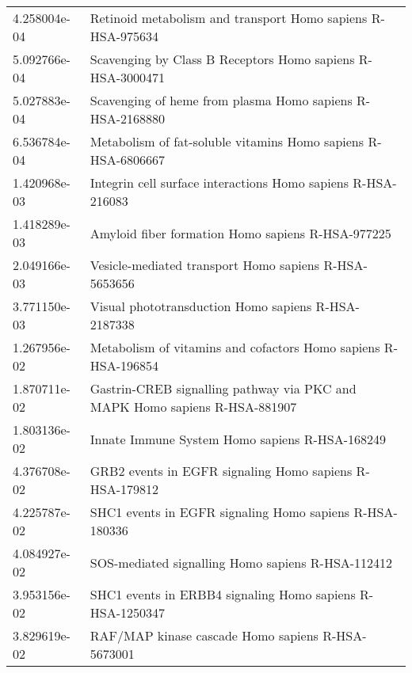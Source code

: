 \begin{longtable}{p{2.4cm}p{14.5cm}}
             4.258004e-04 &                                   Retinoid metabolism and transport Homo sapiens R-HSA-975634 \\
             5.092766e-04 &                                    Scavenging by Class B Receptors Homo sapiens R-HSA-3000471 \\
             5.027883e-04 &                                     Scavenging of heme from plasma Homo sapiens R-HSA-2168880 \\
             6.536784e-04 &                                 Metabolism of fat-soluble vitamins Homo sapiens R-HSA-6806667 \\
             1.420968e-03 &                                  Integrin cell surface interactions Homo sapiens R-HSA-216083 \\
             1.418289e-03 &                                             Amyloid fiber formation Homo sapiens R-HSA-977225 \\
             2.049166e-03 &                                         Vesicle-mediated transport Homo sapiens R-HSA-5653656 \\
             3.771150e-03 &                                           Visual phototransduction Homo sapiens R-HSA-2187338 \\
             1.267956e-02 &                                Metabolism of vitamins and cofactors Homo sapiens R-HSA-196854 \\
             1.870711e-02 &                    Gastrin-CREB signalling pathway via PKC and MAPK Homo sapiens R-HSA-881907 \\
             1.803136e-02 &                                                Innate Immune System Homo sapiens R-HSA-168249 \\
             4.376708e-02 &                                       GRB2 events in EGFR signaling Homo sapiens R-HSA-179812 \\
             4.225787e-02 &                                       SHC1 events in EGFR signaling Homo sapiens R-HSA-180336 \\
             4.084927e-02 &                                             SOS-mediated signalling Homo sapiens R-HSA-112412 \\
             3.953156e-02 &                                     SHC1 events in ERBB4 signaling Homo sapiens R-HSA-1250347 \\
             3.829619e-02 &                                             RAF/MAP kinase cascade Homo sapiens R-HSA-5673001 \\

\end{longtable}
